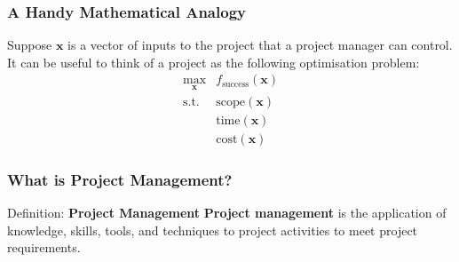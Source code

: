 \documentclass{beamer}
\begin{document}
\begin{frame}
\frametitle{A Handy Mathematical Analogy}
Suppose $\textbf{x}$ is a vector of inputs to the project that a project manager can control. It can be useful to think of a project as the following optimisation problem:
\begin{equation*}
\begin{matrix}
\displaystyle \max_{\textbf{x}} & f_{\textrm{success}}(\textbf{x})  \\
\textrm{s.t.} & \textrm{scope}(\textbf{x}) \\
& \textrm{time}(\textbf{x}) \\
& \textrm{cost}(\textbf{x})
\end{matrix}
\end{equation*}
\end{frame}

\begin{frame}
\frametitle{What is Project Management?}
\begin{block}{Definition: \textbf{Project Management}}
\textbf{Project management} is the application of knowledge, skills, tools, and techniques to project activities to meet project requirements.
\end{block}
\end{frame}
\end{document}
